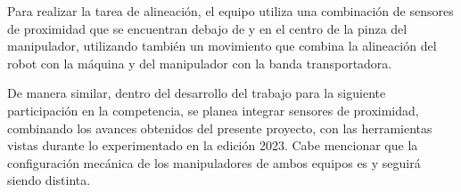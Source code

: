 Para realizar la tarea de alineación, el equipo utiliza una combinación de sensores de proximidad que se encuentran debajo de y en el centro de la pinza del manipulador, utilizando también un movimiento que combina la alineación del robot con la máquina y del manipulador con la banda transportadora.

De manera similar, dentro del desarrollo del trabajo para la siguiente participación en la competencia, se planea integrar sensores de proximidad, combinando los avances obtenidos del presente proyecto, con las herramientas vistas durante lo experimentado en la edición 2023. Cabe mencionar que la configuración mecánica de los manipuladores de ambos equipos es y seguirá siendo distinta. 



